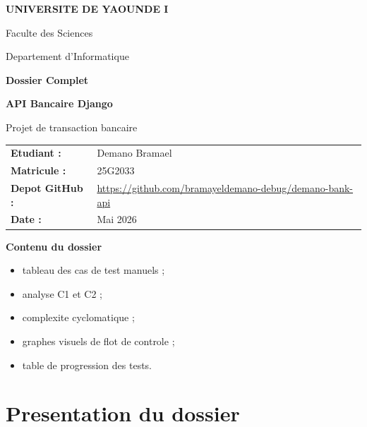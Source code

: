 \documentclass[12pt,a4paper]{article}
\begin{document}
\begin{titlepage}
\centering
\vspace*{1.5cm}

{\Large\bfseries UNIVERSITE DE YAOUNDE I\par}
\vspace{0.3cm}
{\large Faculte des Sciences\par}
\vspace{0.3cm}
{\large Departement d'Informatique\par}

\vspace{2cm}

{\Huge\bfseries\color{titleblue} Dossier Complet\par}
\vspace{0.4cm}
{\LARGE\bfseries API Bancaire Django\par}
\vspace{0.4cm}
{\large Projet de transaction bancaire\par}

\vspace{1.7cm}

\begin{tabular}{ll}
\textbf{Etudiant :} & Demano Bramael \\
\textbf{Matricule :} & 25G2033 \\
\textbf{Depot GitHub :} & \url{https://github.com/bramayeldemano-debug/demano-bank-api} \\
\textbf{Date :} & Mai 2026 \\
\end{tabular}

\vfill
\textbf{Contenu du dossier}

\begin{itemize}[leftmargin=1.2cm]
\item tableau des cas de test manuels ;
\item analyse C1 et C2 ;
\item complexite cyclomatique ;
\item graphes visuels de flot de controle ;
\item table de progression des tests.
\end{itemize}

\end{titlepage}

\section*{Presentation du dossier}
\end{document}
